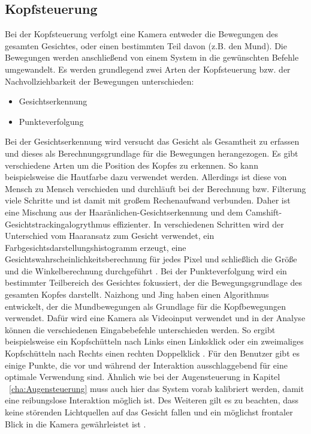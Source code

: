 \subsection{Kopfsteuerung}

Bei der Kopfsteuerung verfolgt eine Kamera entweder die Bewegungen des gesamten Gesichtes, oder einen bestimmten Teil davon (z.B. den Mund). Die Bewegungen werden anschließend von einem System in die gewünschten Befehle umgewandelt.
\newline \newline
Es werden grundlegend zwei Arten der Kopfsteuerung bzw. der Nachvollziehbarkeit der Bewegungen unterschieden:
\begin{itemize}
      \item Gesichtserkennung
      \item Punkteverfolgung
\end{itemize}
\newline
Bei der Gesichtserkennung wird versucht das Gesicht als Gesamtheit zu erfassen und dieses als Berechnungsgrundlage für die Bewegungen herangezogen. Es gibt verschiedene Arten um die Position des Kopfes zu erkennen. So kann beispielsweise die Hautfarbe dazu verwendet werden. Allerdings ist diese von Mensch zu Mensch verschieden und durchläuft bei der Berechnung bzw. Filterung viele Schritte und ist damit mit großem Rechenaufwand verbunden. Daher ist eine Mischung aus der Haaränlichen-Gesichtserkennung und dem Camshift-Gesichtstrackingalogrythmus effizienter. In verschiedenen Schritten wird der Unterschied vom Haaransatz zum Gesicht verwendet, ein Farbgesichtsdarstellungshistogramm erzeugt, eine Gesichtswahrscheinlichkeitsberechnung für jedes Pixel und schließlich die Größe und die Winkelberechnung durchgeführt \cite{FaceTracking}.
\newline
Bei der Punkteverfolgung wird ein bestimmter Teilbereich des Gesichtes fokussiert, der die Bewegungsgrundlage des gesamten Kopfes darstellt. Naizhong und Jing \cite{MouthChinaControl} haben einen Algorithmus entwickelt, der die Mundbewegungen als Grundlage für die Kopfbewegungen verwendet. Dafür wird eine Kamera als Videoinput verwendet und in der Analyse können die verschiedenen Eingabebefehle unterschieden werden. So ergibt beispielsweise ein Kopfschütteln nach Links einen Linksklick oder ein zweimaliges Kopfschütteln nach Rechts einen rechten Doppelklick \cite{MouthChinaControl}.
\newline \newline
Für den Benutzer gibt es einige Punkte, die vor und während der Interaktion ausschlaggebend für eine optimale Verwendung sind. Ähnlich wie bei der Augensteuerung in Kapitel ~\ref{cha:Augensteuerung} muss auch hier das System vorab kalibriert werden, damit eine reibungslose Interaktion möglich ist. Des Weiteren gilt es zu beachten, dass keine störenden Lichtquellen auf das Gesicht fallen und ein möglichst frontaler Blick in die Kamera gewährleistet ist \cite{MouthChinaControl}.

